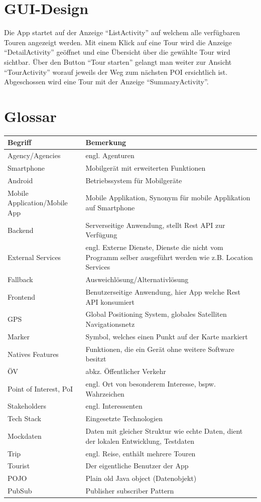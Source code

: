 \documentclass[a4paper,10pt,xetex]{article}
\begin{document}
\section{GUI-Design}\label{gui-design}
Die App startet auf der Anzeige ``ListActivity'' auf welchem alle verfügbaren Touren angezeigt
werden. Mit einem Klick auf eine Tour wird die Anzeige ``DetailActivity'' geöffnet und eine
Übersicht über die gewählte Tour wird sichtbar. Über den Button ``Tour starten'' gelangt
man weiter zur Ansicht ``TourActivity'' worauf jeweils der Weg zum nächsten POI ersichtlich ist.
Abgeschossen wird eine Tour mit der Anzeige ``SummaryActivity''.

\newpage
\section{Glossar}\label{glossar}
\begin{longtabu} to \textwidth { | l | X[l] | }
\hline
\textbf{Begriff} & \textbf{Bemerkung}\\\hline
\endhead

Agency/Agencies & engl. Agenturen\\\hline
Smartphone & Mobilgerät mit erweiterten Funktionen\\\hline
Android & Betriebssystem für Mobilgeräte\\\hline
Mobile Application/Mobile App & Mobile Applikation, Synonym für mobile Applikation auf Smartphone\\\hline
Backend & Serverseitige Anwendung, stellt Rest API zur Verfügung\\\hline
External Services & engl. Externe Dienste, Dienste die nicht vom Programm selber ausgeführt werden wie z.B. Location Services\\\hline
Fallback & Ausweichlösung/Alternativlösung\\\hline
Frontend & Benutzerseitige Anwendung, hier App welche Rest API konsumiert\\\hline
GPS & Global Positioning System, globales Satelliten Navigationsnetz\\\hline
Marker & Symbol, welches einen Punkt auf der Karte markiert\\\hline
Natives Features & Funktionen, die ein Gerät ohne weitere Software besitzt\\\hline
ÖV & abkz. Öffentlicher Verkehr\\\hline
Point of Interest, PoI & engl. Ort von besonderem Interesse, bspw. Wahrzeichen\\\hline
Stakeholders & engl. Interessenten\\\hline
Tech Stack & Eingesetzte Technologien\\\hline
Mockdaten & Daten mit gleicher Struktur wie echte Daten, dient der lokalen Entwicklung, Testdaten \\\hline
Trip & engl. Reise, enthält mehrere Touren\\\hline
Tourist & Der eigentliche Benutzer der App\\\hline
POJO & Plain old Java object (Datenobjekt)\\\hline
PubSub & Publisher subscriber Pattern\\\hline
\end{longtabu}
\end{document}
